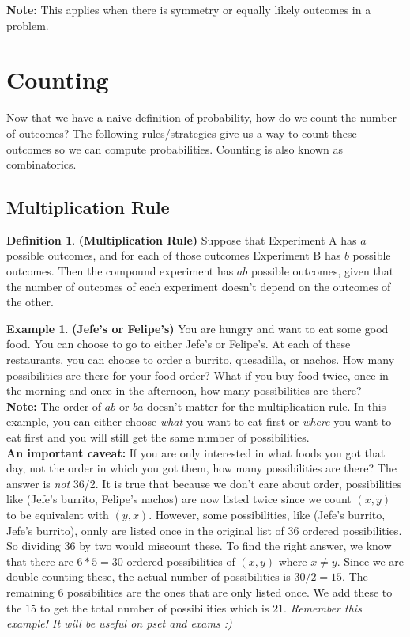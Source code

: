 \documentclass[10pt]{article}
\theoremstyle{definition}
\newtheorem{defin}[theo]{\color{Maroon} Definition}
\newtheorem{example}[theo]{\color{Maroon} Example}
\theoremstyle{remark}
\begin{document}
\noindent
\textbf{Note:} This applies when there is symmetry or equally likely outcomes in a problem.

\section{Counting}

Now that we have a naive definition of probability, how do we count the number of outcomes? The following rules/strategies give us a way to count these outcomes so we can compute probabilities. Counting is also known as combinatorics.

\subsection{Multiplication Rule}
\begin{defin} \textbf{(Multiplication Rule)} Suppose that Experiment A has $a$ possible outcomes, and for each of those outcomes Experiment B has $b$ possible outcomes. Then the compound experiment has $ab$ possible outcomes, given that the number of outcomes of each experiment doesn't depend on the outcomes of the other.
\end{defin}

\begin{example} \textbf{(Jefe's or Felipe's)} You are hungry and want to eat some good food. You can choose to go to either Jefe's or Felipe's. At each of these restaurants, you can choose to order a burrito, quesadilla, or nachos. How many possibilities are there for your food order? What if you buy food twice, once in the morning and once in the afternoon, how many possibilities are there?\\

\noindent
\textbf{Note:} The order of $ab$ or $ba$ doesn't matter for the multiplication rule. In this example, you can either choose \textit{what} you want to eat first or \textit{where} you want to eat first and you will still get the same number of possibilities.\\

\noindent
\textbf{An important caveat: }If you are only interested in what foods you got that day, not the order in which you got them, how many possibilities are there? The answer is \textit{not} 36/2. It is true that because we don't care about order, possibilities like (Jefe's burrito, Felipe's nachos) are now listed twice since we count $(x,y)$ to be equivalent with $(y,x)$. However, some possibilities, like (Jefe's burrito, Jefe's burrito), onnly are listed once in the original list of $36$ ordered possibilities. So dividing 36 by two would miscount these. To find the right answer, we know that there are $6*5=30$ ordered possibilities of $(x,y)$ where $x \neq y$. Since we are double-counting these, the actual number of possibilities is $30/2=15$. The remaining $6$ possibilities are the ones that are only listed once. We add these to the $15$ to get the total number of possibilities which is $21$. \textit{Remember this example! It will be useful on pset and exams :)}
\end{example}
\end{document}
